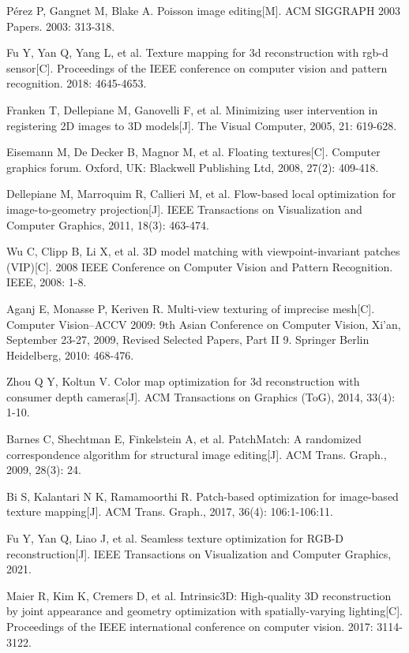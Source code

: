 Pérez P, Gangnet M, Blake A. Poisson image editing[M]. ACM SIGGRAPH 2003 Papers. 2003: 313-318.

Fu Y, Yan Q, Yang L, et al. Texture mapping for 3d reconstruction with rgb-d sensor[C]. Proceedings of the IEEE conference on computer vision and pattern recognition. 2018: 4645-4653.

Franken T, Dellepiane M, Ganovelli F, et al. Minimizing user intervention in registering 2D images to 3D models[J]. The Visual Computer, 2005, 21: 619-628.

Eisemann M, De Decker B, Magnor M, et al. Floating textures[C]. Computer graphics forum. Oxford, UK: Blackwell Publishing Ltd, 2008, 27(2): 409-418.

Dellepiane M, Marroquim R, Callieri M, et al. Flow-based local optimization for image-to-geometry projection[J]. IEEE Transactions on Visualization and Computer Graphics, 2011, 18(3): 463-474.

Wu C, Clipp B, Li X, et al. 3D model matching with viewpoint-invariant patches (VIP)[C]. 2008 IEEE Conference on Computer Vision and Pattern Recognition. IEEE, 2008: 1-8.

Aganj E, Monasse P, Keriven R. Multi-view texturing of imprecise mesh[C]. Computer Vision–ACCV 2009: 9th Asian Conference on Computer Vision, Xi’an, September 23-27, 2009, Revised Selected Papers, Part II 9. Springer Berlin Heidelberg, 2010: 468-476.

Zhou Q Y, Koltun V. Color map optimization for 3d reconstruction with consumer depth cameras[J]. ACM Transactions on Graphics (ToG), 2014, 33(4): 1-10.

Barnes C, Shechtman E, Finkelstein A, et al. PatchMatch: A randomized correspondence algorithm for structural image editing[J]. ACM Trans. Graph., 2009, 28(3): 24.

Bi S, Kalantari N K, Ramamoorthi R. Patch-based optimization for image-based texture mapping[J]. ACM Trans. Graph., 2017, 36(4): 106:1-106:11.

Fu Y, Yan Q, Liao J, et al. Seamless texture optimization for RGB-D reconstruction[J]. IEEE Transactions on Visualization and Computer Graphics, 2021.

Maier R, Kim K, Cremers D, et al. Intrinsic3D: High-quality 3D reconstruction by joint appearance and geometry optimization with spatially-varying lighting[C]. Proceedings of the IEEE international conference on computer vision. 2017: 3114-3122. 


